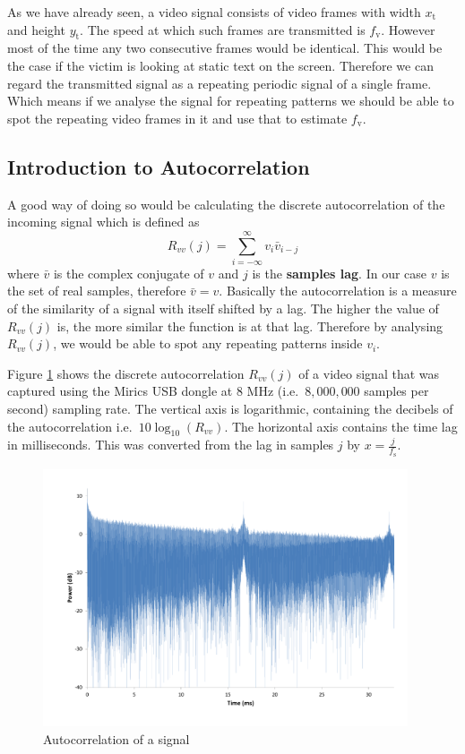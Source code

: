 \documentclass[a4paper,12pt,twoside,openright]{report}
\begin{document}
As we have already seen, a video signal consists of video frames with width $x_\text{t}$ and height $y_\text{t}$. The speed at which such frames are transmitted is $f_\text{v}$. However most of the time any two consecutive frames would be identical. This would be the case if the victim is looking at static text on the screen. Therefore we can regard the transmitted signal as a repeating periodic signal of a single frame. Which means if we analyse the signal for repeating patterns we should be able to spot the repeating video frames in it and use that to estimate $f_\text{v}$.

\subsection{Introduction to Autocorrelation}
A good way of doing so would be calculating the discrete autocorrelation \cite{bracewell1965autocorrelation} of the incoming signal which is defined as 
\begin{equation}
\label{eq:autocorrelationdef}
R_{vv}(j)=\sum\limits_{i=-\infty}^{\infty} v_{i} \bar{v}_{i-j}
\end{equation}
where $\bar{v}$ is the complex conjugate of $v$ and $j$ is the \textbf{samples lag}. In our case $v$ is the set of real samples, therefore $\bar{v} = v$. Basically the autocorrelation is a measure of the similarity of a signal with itself shifted by a lag. The higher the value of $R_{vv}(j)$ is, the more similar the function is at that lag. Therefore by analysing $R_{vv}(j)$, we would be able to spot any repeating patterns inside $v_{i}$.

Figure \ref{fig:autocorr} shows the discrete autocorrelation $R_{vv}(j)$ of a video signal that was captured using the Mirics USB dongle at 8 MHz (i.e.\  $8,000,000$ samples per second) sampling rate. The vertical axis is logarithmic, containing the decibels of the autocorrelation i.e.\  $10 \log_{10}( R_{vv} )$. The horizontal axis contains the time lag in milliseconds. This was converted from the lag in samples $j$ by $x = \frac{j}{f_\text{s}}$.

\begin{figure}[h]
\centering
  \includegraphics[width=0.96\textwidth]{autocorr}
  \caption{Autocorrelation of a signal}
  \label{fig:autocorr}
\end{figure}
\end{document}
